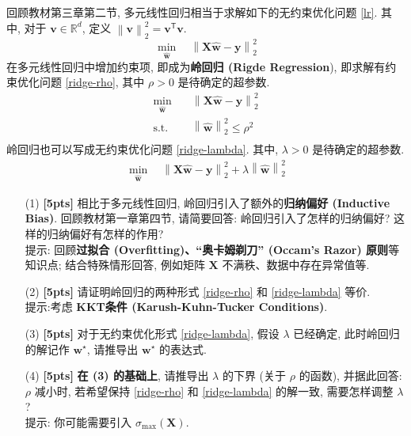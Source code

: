 \documentclass[a4paper]{article}
\numberwithin{equation}{section}
\theoremstyle{definition}
\def \transposed {\mathsf{T}}
\def \Real {\mathbb{R}}
\def \X {\mathbf{X}}
\def \v {\bm{v}}
\def \wh {\hat{\bm{w}}}
\def \ws {\bm{w}^\star}
\def \y {\bm{y}}
\newcommand\norm[1]{\left\| #1 \right\|}
\begin{document}
回顾教材第三章第二节, 多元线性回归相当于求解如下的无约束优化问题 \eqref{lr}. 其中, 对于 $\v \in \Real^d$, 定义 $\norm{\v}_2^2 = \v^\transposed \v$.
\begin{equation}
	\min_{\wh} \quad\norm{\X\wh - \y}_2^2
	\label{lr}
\end{equation}
在多元线性回归中增加约束项, 即成为\textbf{岭回归 (Rigde Regression}), 即求解有约束优化问题 \eqref{ridge-rho}, 其中 $\rho > 0$ 是待确定的超参数.
\begin{equation}
	\begin{aligned}
		\min_{\wh} \quad  & \norm{\X\wh - \y}_2^2           \\
		\text{s.t.} \quad & \norm{\wh}_2^2 \leqslant \rho^2 \\
	\end{aligned}
	\label{ridge-rho}
\end{equation}
岭回归也可以写成无约束优化问题 \eqref{ridge-lambda}. 其中, $\lambda > 0$ 是待确定的超参数.
\begin{equation}
	\begin{aligned}
		\min_{\wh} \quad\norm{\X\wh - \y}_2^2 + \lambda \norm{\wh}_2^2
	\end{aligned}
	\label{ridge-lambda}
\end{equation}

\begin{itemize}
	\item[(1)] \textbf{[5pts]} 相比于多元线性回归, 岭回归引入了额外的\textbf{归纳偏好 (Inductive Bias)}. 回顾教材第一章第四节, 请简要回答: 岭回归引入了怎样的归纳偏好? 这样的归纳偏好有怎样的作用? \\
	      提示: 回顾\textbf{过拟合 (Overfitting)、``奥卡姆剃刀'' (Occam's Razor) 原则}等知识点; 结合特殊情形回答, 例如矩阵 $\X$ 不满秩、数据中存在异常值等.
	\item[(2)] \textbf{[5pts]} 请证明岭回归的两种形式 \eqref{ridge-rho} 和 \eqref{ridge-lambda} 等价. \\
	      提示:考虑 \textbf{KKT条件 (Karush-Kuhn-Tucker Conditions)}.
	\item[(3)] \textbf{[5pts]} 对于无约束优化形式 \eqref{ridge-lambda}, 假设 $\lambda$ 已经确定, 此时岭回归的解记作 $\ws$, 请推导出 $\ws$ 的表达式.
	\item[(4)] \textbf{[5pts]} \textbf{在 (3) 的基础上}, 请推导出 $\lambda$ 的下界 (关于 $\rho$ 的函数), 并据此回答: $\rho$ 减小时, 若希望保持 \eqref{ridge-rho} 和 \eqref{ridge-lambda} 的解一致, 需要怎样调整 $\lambda$? \\
	      提示: 你可能需要引入 $\sigma_{\max}(\X)$.
\end{itemize}
\end{document}
